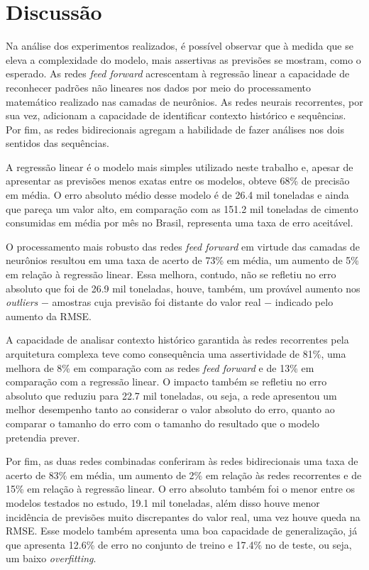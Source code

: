 
\chapter{Discussão}
\label{chap:discussao}

Na análise dos experimentos realizados, é possível observar que à medida que 
se eleva a complexidade do modelo, mais assertivas as previsões se mostram,
como o esperado. As redes \textit{feed forward} acrescentam à regressão linear
a capacidade de reconhecer padrões não lineares nos dados por meio do 
processamento matemático realizado nas camadas de neurônios. As redes neurais 
recorrentes, por sua vez, adicionam a capacidade de identificar contexto 
histórico e sequências. Por fim, as redes bidirecionais agregam a habilidade 
de fazer análises nos dois sentidos das sequências.

A regressão linear é o modelo mais simples utilizado neste trabalho e, apesar
de apresentar as previsões menos exatas entre os modelos, obteve 68\% de 
precisão em média. O erro absoluto médio desse modelo é de 26.4 mil toneladas
e ainda que pareça um valor alto, em comparação com as 151.2 mil toneladas de cimento
consumidas em média por mês no Brasil, representa uma taxa de erro aceitável.

O processamento mais robusto das redes \textit{feed forward} em virtude das 
camadas de neurônios resultou em uma taxa de acerto de 73\% em média, um aumento 
de 5\% em relação à regressão linear. Essa melhora, contudo, não se refletiu 
no erro absoluto que foi de 26.9 mil toneladas, houve, também, um provável
aumento nos \textit{outliers} $-$ amostras cuja previsão foi distante do valor 
real $-$ indicado pelo aumento da RMSE.

A capacidade de analisar contexto histórico garantida às redes recorrentes pela 
arquitetura complexa teve como consequência uma assertividade de 81\%, uma melhora 
de 8\% em comparação com as redes \textit{feed forward} e de 13\% em comparação 
com a regressão linear. O impacto também se refletiu no erro absoluto que 
reduziu para 22.7 mil toneladas, ou seja, a rede apresentou um melhor desempenho 
tanto ao considerar o valor absoluto do erro, quanto ao comparar o tamanho do 
erro com o tamanho do resultado que o modelo pretendia prever.

Por fim, as duas redes combinadas conferiram às redes bidirecionais uma taxa de 
acerto de 83\% em média, um aumento de 2\% em relação às redes recorrentes e de
15\% em relação à regressão linear. O erro absoluto também foi o menor entre 
os modelos testados no estudo, 19.1 mil toneladas, além disso houve menor 
incidência de previsões muito discrepantes do valor real, uma vez houve queda
na RMSE. Esse modelo também apresenta uma boa capacidade de generalização, 
já que apresenta 12.6\% de erro no conjunto de treino e 17.4\% no de teste,
ou seja, um baixo \textit{overfitting}.

